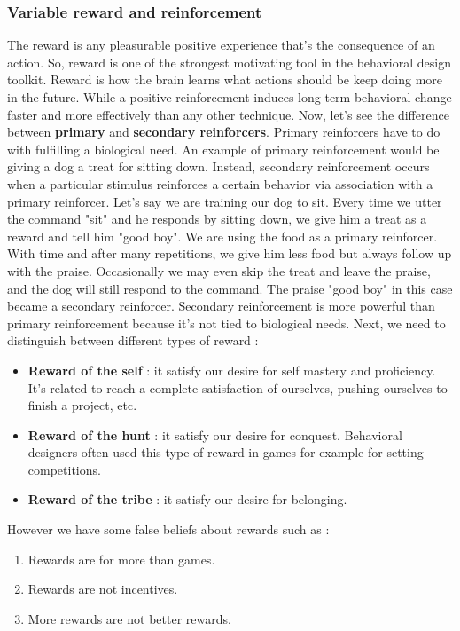 \documentclass[11pt]{article}
\begin{document}
\subsubsection{Variable reward and reinforcement}
The reward is any pleasurable positive experience that's the consequence of an action. So, reward is one of the strongest motivating tool in the behavioral design toolkit. Reward is how the brain learns what actions should be keep doing more in the future. While a positive reinforcement induces long-term behavioral change faster and more effectively than any other technique. Now, let's see the difference between \textbf{primary} and \textbf{secondary reinforcers}. Primary reinforcers have to do with fulfilling a biological need. An example of primary reinforcement would be giving a dog a treat for sitting down. Instead, secondary reinforcement occurs when a particular stimulus reinforces a certain behavior via association with a primary reinforcer. Let's say we are training our dog to sit. Every time we utter the command "sit" and he responds by sitting down, we give him a treat as a reward and tell him "good boy". We are using the food as a primary reinforcer. With time and after many repetitions, we give him less food but always follow up with the praise. Occasionally we may even skip the treat and leave the praise, and the dog will still respond to the command. The praise "good boy" in this case became a secondary reinforcer. Secondary reinforcement is more powerful than primary reinforcement because it's not tied to biological needs. Next, we need to distinguish between different types of reward :

\begin{itemize}
\item \textbf{Reward of the self} : it satisfy our desire for self mastery and proficiency. It's related to reach a complete satisfaction of ourselves, pushing ourselves to finish a project, etc. 
\item \textbf{Reward of the hunt} : it satisfy our desire for conquest. Behavioral designers often used this type of reward in games for example for setting competitions.

\item \textbf{Reward of the tribe} : it satisfy our desire for belonging.
\end{itemize}

However we have some false beliefs about rewards such as :

\begin{enumerate}
\item Rewards are for more than games.
\item Rewards are not incentives.
\item More rewards are not better rewards.
\end{enumerate}
\end{document}
